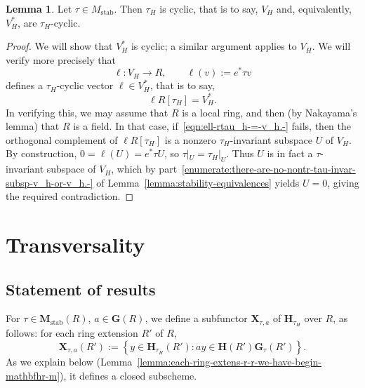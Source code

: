 \documentclass[reqno]{amsart}
\DeclareMathOperator{\stab}{stab}
\theoremstyle{plain} \newtheorem{theorem} {Theorem} \newtheorem{conjecture} {Conjecture} \newtheorem{corollary} [theorem] {Corollary} \newtheorem{proposition} [theorem] {Proposition} \newtheorem{fact} [theorem] {Fact}
\theoremstyle{definition} \newtheorem{definition} [theorem] {Definition}
\theoremstyle{itplain} %
\newtheorem{lemma}[theorem]{Lemma}
\begin{document}
\begin{lemma}\label{lemma:tau-stable-implies-tauH-cyclic}
  Let $\tau \in M_{\stab}$.  Then $\tau_H$ is cyclic, that is to say, $V_H$ and, equivalently, $V_H^*$, are $\tau_H$-cyclic.
\end{lemma}
\begin{proof}
  We will show that $V_H^*$ is cyclic; a similar argument applies to $V_H$.  We will verify more precisely that
  \begin{equation*}
    \ell : V_H \rightarrow R, \qquad \ell(v) := e^* \tau v
  \end{equation*}
  defines a $\tau_H$-cyclic vector $\ell \in V_H^*$, that is to say,
  \begin{equation}\label{eqn:ell-rtau_h-=-v_h.-}
    \ell R[\tau_H] = V_H^*.
  \end{equation}
  In verifying this, we may assume that $R$ is a local ring, and then (by Nakayama's lemma) that $R$ is a field.  In that case, if~\eqref{eqn:ell-rtau_h-=-v_h.-} fails, then the orthogonal complement of $\ell R[\tau_H]$ is a nonzero $\tau_H$-invariant subspace $U$ of $V_H$.  By construction, $0 = \ell(U) = e^* \tau U$, so $\tau|_{U} = \tau_H|_{U}$.  Thus $U$ is in fact a $\tau$-invariant subspace of $V_H$, which by part~\eqref{enumerate:there-are-no-nontr-tau-invar-subsp-v_h-or-v_h.-} of Lemma~\ref{lemma:stability-equivalences} yields $U = 0$, giving the required contradiction.
\end{proof}

\section{Transversality}\label{sec:transversality}

\subsection{Statement of results}\label{sec:transversality-statement-results}
For $\tau \in \mathbf{M}_{\stab}(R)$, $a \in \mathbf{G}(R)$, we define a subfunctor $\mathbf{X}_{\tau,a}$ of $\mathbf{H}_{\tau_H}$ over $R$, as follows: for each ring extension $R'$ of $R$,
\begin{equation*}
  \mathbf{X}_{\tau,a}(R') := \left\{ y \in \mathbf{H}_{\tau_H}(R') : a y \in \mathbf{H}(R') \mathbf{G}_{\tau}(R') \right\}.
\end{equation*}
As we explain below (Lemma~\ref{lemma:each-ring-extens-r-r-we-have-begin-mathbfhr-m}), it defines a closed subscheme.
\end{document}
